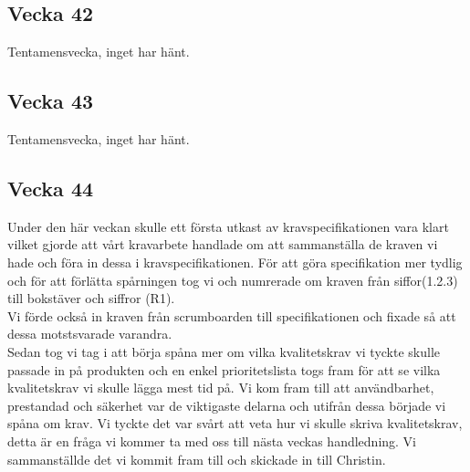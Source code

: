 \documentclass[12pt]{article}
\begin{document}
    \subsection{Vecka 42}
    Tentamensvecka, inget har hänt.
    
    \subsection{Vecka 43}
    Tentamensvecka, inget har hänt.
    
    \subsection{Vecka 44}
    Under den här veckan skulle ett första utkast av kravspecifikationen vara klart vilket gjorde att vårt kravarbete handlade om att sammanställa de kraven vi hade och föra in dessa i kravspecifikationen. För att göra specifikation mer tydlig och för att förlätta spårningen tog vi och numrerade om kraven från siffor(1.2.3) till bokstäver och siffror (R1). 
    \\
    Vi förde också in kraven från scrumboarden till specifikationen och fixade så att dessa motstsvarade varandra.
    \\
     Sedan tog vi tag i att börja spåna mer om vilka kvalitetskrav vi tyckte skulle passade in på produkten och en enkel prioritetslista togs fram för att se vilka kvalitetskrav vi skulle lägga mest tid på. Vi kom fram till att användbarhet, prestandad och säkerhet var de viktigaste delarna och utifrån dessa började vi spåna om krav. Vi tyckte det var svårt att veta hur vi skulle skriva kvalitetskrav, detta är en fråga vi kommer ta med oss till nästa veckas handledning. Vi sammanställde det vi kommit fram till och skickade in till Christin. 
\end{document}
